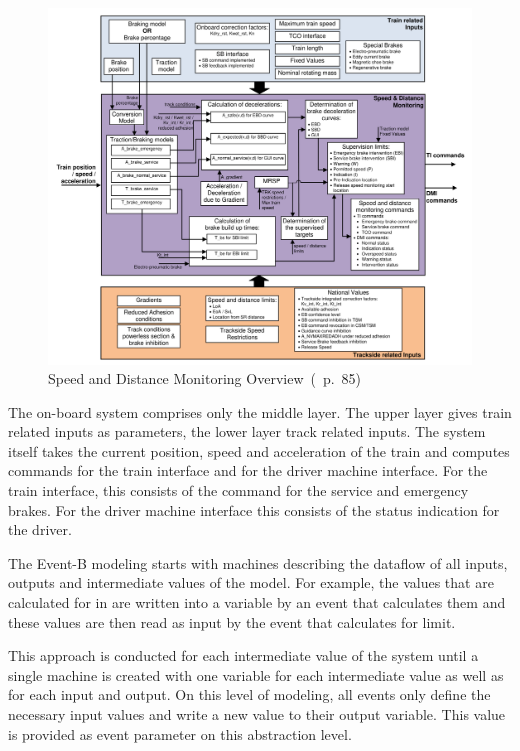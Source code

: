 \documentclass{template/openetcs_article}
\begin{document}
\begin{figure}[ht]
  \centering
  \includegraphics[width=.9\textwidth]{Overview_13_3}
  \caption{Speed and Distance Monitoring Overview~(\cite{SRS-026-330}~p.~85)}
  \label{fig:speed-distance-system}
\end{figure}

The on-board system comprises only the middle layer. The upper layer gives train
related inputs as parameters, the lower layer track related inputs. The system
itself takes the current position, speed and acceleration of the train and
computes commands for the train interface and for the driver machine
interface. For the train interface, this consists of the command for the service
and emergency brakes. For the driver machine interface this consists of the
status indication for the driver.

The Event-B modeling starts with machines describing the dataflow of all inputs,
outputs and intermediate values of the model. For example, the values that are
calculated for  in 
are written into a variable by an event that calculates them and these values
are then read as input by the event that calculates  for 
limit.

This approach is conducted for each intermediate value of the system until a
single machine is created with one variable for each intermediate value as well
as for each input and output. On this level of modeling, all events only define
the necessary input values and write a new value to their output variable. This
value is provided as event parameter on this abstraction level.
\end{document}
